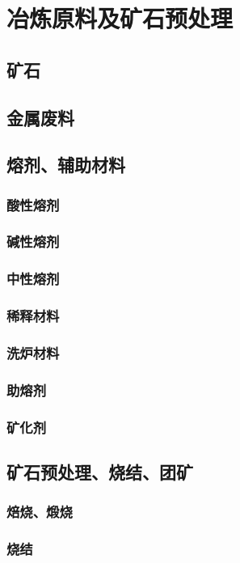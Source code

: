 \documentclass[UTF8]{../../ApplicationUniverse}
\begin{document}
\section{冶炼原料及矿石预处理}
    \subsection{矿石}
    \subsection{金属废料}
    \subsection{熔剂、辅助材料}
        \subsubsection{酸性熔剂}
        \subsubsection{碱性熔剂}
        \subsubsection{中性熔剂}
        \subsubsection{稀释材料}
        \subsubsection{洗炉材料}
        \subsubsection{助熔剂}
        \subsubsection{矿化剂}
    \subsection{矿石预处理、烧结、团矿}
        \subsubsection{焙烧、煅烧}
        \subsubsection{烧结}
\end{document}

